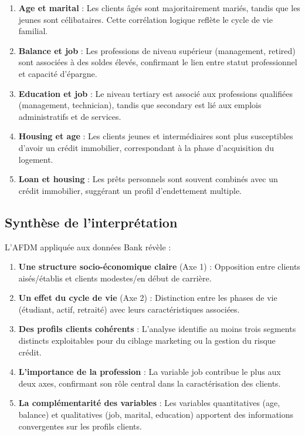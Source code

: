 \documentclass[12pt,a4paper]{article}
\begin{document}
\begin{enumerate}
    \item \textbf{Age et marital} : Les clients âgés sont majoritairement mariés, tandis que les jeunes sont célibataires. Cette corrélation logique reflète le cycle de vie familial.
    
    \item \textbf{Balance et job} : Les professions de niveau supérieur (management, retired) sont associées à des soldes élevés, confirmant le lien entre statut professionnel et capacité d'épargne.
    
    \item \textbf{Education et job} : Le niveau tertiary est associé aux professions qualifiées (management, technician), tandis que secondary est lié aux emplois administratifs et de services.
    
    \item \textbf{Housing et age} : Les clients jeunes et intermédiaires sont plus susceptibles d'avoir un crédit immobilier, correspondant à la phase d'acquisition du logement.
    
    \item \textbf{Loan et housing} : Les prêts personnels sont souvent combinés avec un crédit immobilier, suggérant un profil d'endettement multiple.
\end{enumerate}

\subsection{Synthèse de l'interprétation}

L'AFDM appliquée aux données Bank révèle :

\begin{enumerate}
    \item \textbf{Une structure socio-économique claire} (Axe 1) : Opposition entre clients aisés/établis et clients modestes/en début de carrière.
    
    \item \textbf{Un effet du cycle de vie} (Axe 2) : Distinction entre les phases de vie (étudiant, actif, retraité) avec leurs caractéristiques associées.
    
    \item \textbf{Des profils clients cohérents} : L'analyse identifie au moins trois segments distincts exploitables pour du ciblage marketing ou la gestion du risque crédit.
    
    \item \textbf{L'importance de la profession} : La variable job contribue le plus aux deux axes, confirmant son rôle central dans la caractérisation des clients.
    
    \item \textbf{La complémentarité des variables} : Les variables quantitatives (age, balance) et qualitatives (job, marital, education) apportent des informations convergentes sur les profils clients.
\end{enumerate}
\end{document}
